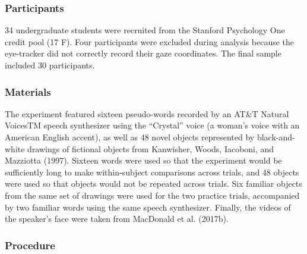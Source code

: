 \documentclass[oneside]{report}
\begin{document}
\subsubsection{Participants}\label{participants-7}

34 undergraduate students were recruited from the Stanford Psychology
One credit pool (17 F). Four participants were excluded during analysis
because the eye-tracker did not correctly record their gaze coordinates.
The final sample included 30 participants.

\subsubsection{Materials}\label{materials-1}

The experiment featured sixteen pseudo-words recorded by an AT\&T
Natural VoicesTM speech synthesizer using the ``Crystal'' voice (a
woman's voice with an American English accent), as well as 48 novel
objects represented by black-and-white drawings of fictional objects
from Kanwisher, Woods, Iacoboni, and Mazziotta (1997). Sixteen words
were used so that the experiment would be sufficiently long to make
within-subject comparisons across trials, and 48 objects were used so
that objects would not be repeated across trials. Six familiar objects
from the same set of drawings were used for the two practice trials,
accompanied by two familiar words using the same speech synthesizer.
Finally, the videos of the speaker's face were taken from MacDonald et
al. (2017b).

\subsubsection{Procedure}\label{procedure-2}
\end{document}
